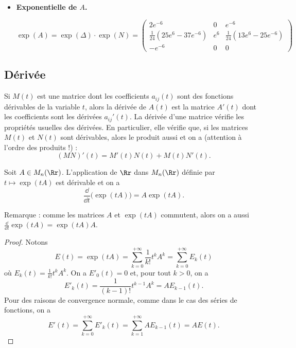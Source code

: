 \documentclass[12pt, class=report,crop=false]{standalone}
\begin{document}
\begin{exemple}
\begin{itemize}
\item \textbf{Exponentielle de $A$.}


$$\exp(A) 
= \exp(\Delta) \cdot \exp(N)
= \begin{pmatrix}
2 e^{-6} & 0 & e^{-6} \\
\frac{1}{24} (25 e^{6} - 37e^{-6}) & e^{6} & \frac{1}{24} (13 e^{6} - 25e^{-6}) \\
-e^{-6} & 0 & 0
\end{pmatrix}
$$
\end{itemize}
\end{exemple}


 
\subsection{Dérivée}

Si $M(t)$ est une matrice dont les coefficients $a_{ij}(t)$ sont des fonctions dérivables de la variable $t$, alors la dérivée de $A(t)$ est la matrice $A'(t)$ dont les coefficients sont les dérivées $a_{ij}'(t)$.
La dérivée d'une matrice vérifie les propriétés usuelles des dérivées. 
En particulier, elle vérifie que, si les matrices $M(t)$ et $N(t)$ sont dérivables, alors le produit aussi et on a (attention à l'ordre des produits !) :
\[(MN)'(t) = M'(t)N(t) + M(t) N'(t) . \]


\begin{proposition}
Soit $A\in M_n(\Rr)$. L'application de $\Rr$ dans
$M_n(\Rr)$ définie par $t \mapsto\exp(tA)$ est dérivable et on a 
$$\frac{\dd}{\dd t} \big( \exp(t A) \big) = A \exp(t A).$$
\end{proposition} 

Remarque : comme les matrices $A$ et $\exp(tA)$ commutent, alors on a aussi
$\frac{\dd}{\dd t} \exp(t A) = \exp(t A) A$.


\begin{proof}
Notons $$E(t)=\exp(tA) = \sum_{k=0}^{+\infty}{\frac{1}{k!}}t^kA^k=\sum_{k=0}^{+\infty}E_k(t)$$
où $E_k(t)={\frac{1}{k!}}t^kA^k$. On a $E'_0(t) = 0$ et, pour tout $k>0$, on a 
$$E'_k(t)={\frac{1}{(k-1)!}}t^{k-1}A^k=AE_{k-1}(t).$$
Pour des raisons de convergence normale, comme dans le cas des séries de fonctions, on a 
$$E'(t)=\sum_{k=0}^{+\infty}E'_k(t)=\sum_{k=1}^{+\infty}A E_{k-1}(t)=A E(t).$$
\end{proof}
 
 
 
 
 
\end{document}
